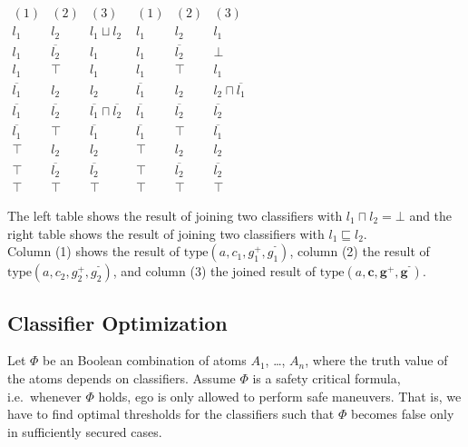 \begin{example}
\begin{table}
$\begin{array}{cc|c}
    (1)&(2)&(3)\\
    \hline
    l_1 &l_2 & l_1 \sqcup l_2\\
    l_1 &\overline{l_2} & l_1\\
    l_1 &\top& l_1\\
    \overline{l_1} &l_2 & l_2\\
    \overline{l_1} &\overline{l_2} & \overline{l_1}\sqcap \overline{l_2}\\
    \overline{l_1} &\top& \overline{l_1}\\
    \top & l_2 & l_2\\
    \top & \overline{l_2} & \overline{l_2}\\
    \top & \top & \top
  \end{array}$
  \quad
  $\begin{array}{cc|c}
    (1)&(2)&(3)\\
    \hline
    l_1 &l_2 & l_1\\
    l_1 &\overline{l_2} & \bot\\
    l_1 &\top & l_1 \\
    \overline{l_1} &l_2 & l_2 \sqcap \overline{l_1}\\
    \overline{l_1} &\overline{l_2} & \overline{l_2}\\
    \overline{l_1} &\top & \overline{l_1}\\
    \top & l_2 & l_2\\
    \top &\overline{l_2} & \overline{l_2}\\
    \top & \top & \top
  \end{array}$
  \caption{ The left table shows the result of joining two classifiers with $l_1 \sqcap l_2=\bot$ and the right table shows the result of joining two classifiers with
  $l_1 \sqsubseteq l_2$.\\ Column (1) shows the result of $\mathrm{type}(a,c_1,g_1^+,g_1^⁻)$,
  column (2) the result of $\mathrm{type}(a,c_2,g_2^+,g_2^⁻)$, and
  column (3) the joined result of $\mathrm{type}(a,\mathbf c, \mathbf g^+, \mathbf g^⁻)$.}
\end{table}

\end{example}

\subsection{Classifier Optimization}
Let $\Phi$ be an Boolean combination of atoms $A_1$, \dots, $A_n$, where the truth value of the atoms depends on classifiers.
Assume $\Phi$ is a safety critical formula, i.e.\ whenever $\Phi$ holds, ego is only allowed to perform safe maneuvers. That is, we have to find optimal thresholds for the classifiers such that $\Phi$ becomes false only in sufficiently secured cases.

